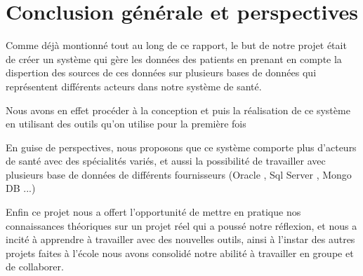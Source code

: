 \chapter*{Conclusion générale et perspectives}

Comme déjà montionné tout au long de ce rapport, le but de notre projet était de créer un système qui gère les données des patients en prenant en compte la dispertion des sources de ces données sur plusieurs bases de données qui représentent différents acteurs dans notre système de santé.

Nous avons en effet procéder à la conception et puis la réalisation de ce système en utilisant des outils qu'on utilise pour la première fois

En guise de perspectives, nous proposons que ce système comporte plus d'acteurs de santé avec des spécialités variés, et aussi la possibilité de travailler avec plusieurs base de données de différents fournisseurs (Oracle , Sql Server , Mongo DB ...) 

Enfin ce projet nous a offert l'opportunité de mettre en pratique nos connaissances théoriques sur un projet réel qui a poussé notre réflexion, et nous a incité à apprendre à travailler avec des nouvelles outils, ainsi à l'instar des autres projets faites à l'école nous avons consolidé notre abilité à travailler en groupe et de collaborer.

